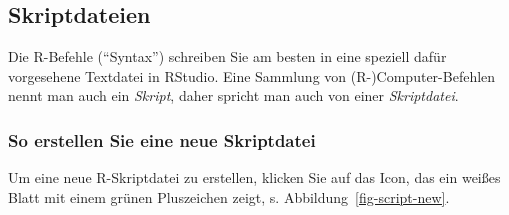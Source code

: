 \documentclass[
  letterpaper,
]{scrbook}
\theoremstyle{definition}
\theoremstyle{definition}
\theoremstyle{definition}
\theoremstyle{remark}
\begin{document}
\begin{figure}
{\begin{figure}[H]
\begin{minipage}{0.20\linewidth}
{}


\end{minipage}%

\end{figure}%

}

\caption{\label{fig-projects}}

\end{figure}%

\subsection{Skriptdateien}\label{skriptdateien}

Die R-Befehle (``Syntax'') schreiben Sie am besten in eine speziell
dafür vorgesehene Textdatei in RStudio. Eine Sammlung von
(R-)Computer-Befehlen nennt man auch ein \emph{Skript}, daher spricht
man auch von einer \emph{Skriptdatei}.

\subsubsection{So erstellen Sie eine neue
Skriptdatei}\label{so-erstellen-sie-eine-neue-skriptdatei}

Um eine neue R-Skriptdatei zu erstellen, klicken Sie auf das Icon, das
ein weißes Blatt mit einem grünen Pluszeichen zeigt, s.
Abbildung~\ref{fig-script-new}.
\end{document}
